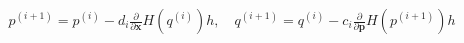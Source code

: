 \documentclass[preview]{standalone}
\begin{document}
\begin{align*}
p^{(i+1)}=p^{(i)}-d_i\frac{\partial}{\partial\mathbf x}H(q^{(i)})h , \quad q^{(i+1)}=q^{(i)}-c_i\frac{\partial}{\partial\mathbf p}H(p^{(i+1)})h
\end{align*}
\end{document}
